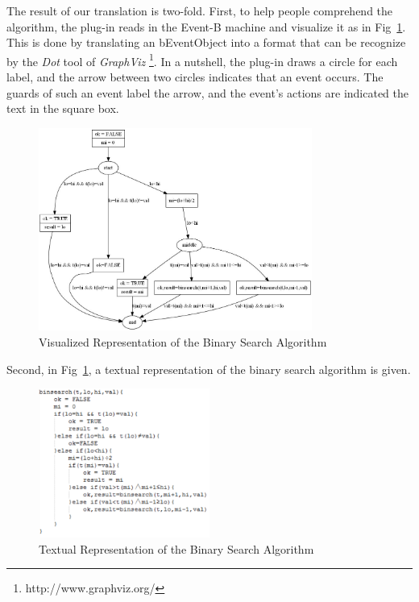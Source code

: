 \documentclass{easychair}
\begin{document}
The result of our translation is two-fold. First, to help people comprehend the algorithm, the plug-in reads in the Event-B machine and visualize it as in Fig~\ref{fig:pix}. This is done by translating an bEventObject into a format that can be recognize by the \textit{Dot} tool of \textit{GraphViz} \footnote{http://www.graphviz.org/}. In a nutshell, the plug-in draws a circle for each label, and the arrow between two circles indicates that an event occurs. The guards of such an event label the arrow, and the event's actions are indicated the text in the square box. 

\begin{figure}[!h]
  \centering
    \includegraphics[width=0.8\textwidth]{img/pix.jpg}
  \caption{Visualized Representation of the Binary Search Algorithm}
  \label{fig:pix}
\end{figure}

Second, in Fig~\ref{fig:pix}, a textual representation of the binary search algorithm is given.
\begin{figure}[!h]
  \centering
    \includegraphics[width=0.5\textwidth]{img/alg.jpg}
  \caption{Textual Representation of the Binary Search Algorithm}
  \label{fig:alg}
\end{figure}
\end{document}
